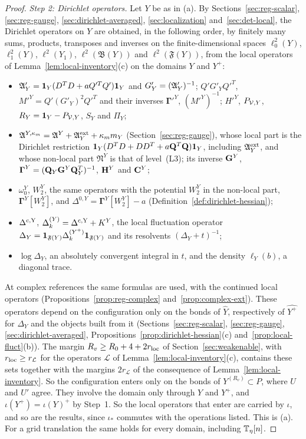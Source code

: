 \begin{proof}
\emph{Step 2: Dirichlet operators.} Let $Y$ be as in (a). By Sections~\ref{sec:reg-scalar}, \ref{sec:reg-gauge}, \ref{sec:dirichlet-averaged}, \ref{sec:localization} and~\ref{sec:det-local}, the Dirichlet operators on $Y$ are obtained, in the following order, by finitely many sums, products, transposes and inverses on the finite-dimensional spaces $\ell^2_0(Y)$, $\ell^2_1(Y)$, $\ell^2(Y_1)$, $\ell^2(\mathfrak B(Y))$ and $\ell^2(\mathfrak F(Y))$, from the local operators of Lemma~\ref{lem:local-inventory}(c) on the domains $Y$ and $Y^+$:
\begin{itemize}
\item $\mathfrak A'_Y=\mathbf 1_Y(D^TD+aQ'^TQ'^{\vphantom{T}})\mathbf 1_Y$ and $G'_Y=(\mathfrak A'_Y)^{-1}$; $Q'G'_YQ'^T$, $M'^Y=Q'(G'_Y)^2Q'^T$ and their inverses $\boldsymbol\Gamma'^Y$, $(M'^Y)^{-1}$; $H'^Y$, $P_{\mathcal V,Y}$, $R_Y=\mathbf 1_Y-P_{\mathcal V,Y}$, $S_Y$ and $\Pi_Y$;
\item $\mathfrak A^{Y,\kappa_m}=\mathfrak A^Y+\mathfrak A^{\rm ext}_Y+\kappa_mm_Y$ (Section~\ref{sec:reg-gauge}), whose local part is the Dirichlet restriction $\mathbf 1_Y(D^TD+DD^T+a\mathbf Q^T\mathbf Q)\mathbf 1_Y$, including $\mathfrak A^{\rm ext}_Y$, and whose non-local part $\mathfrak N^Y$ is that of level~(L3); its inverse $\mathbf G^Y$, $\boldsymbol\Gamma^Y=(\mathbf Q_Y\mathbf G^Y\mathbf Q_Y^T)^{-1}$, $\mathbf H^Y$ and $\mathbf C^Y$;
\item $\omega_0^Y$, $W_2^Y$, the same operators with the potential $W_2^Y$ in the non-local part, $\boldsymbol\Gamma^Y[W_2^Y]$, and $\Delta^{0,Y}=\boldsymbol\Gamma^Y[W_2^Y]-a$ (Definition~\ref{def:dirichlet-hessian});
\item $\Delta^{\rm c,Y}$, $\Delta^{(Y)}_k=\Delta^{\rm c,Y}+K^Y$, the local fluctuation operator $\Delta_Y=\mathbf 1_{\mathfrak F(Y)}\Delta^{(Y^+)}_k\mathbf 1_{\mathfrak F(Y)}$ and its resolvents $(\Delta_Y+t)^{-1}$;
\item $\log\Delta_Y$, an absolutely convergent integral in $t$, and the density $\ell_Y(b)$, a diagonal trace.
\end{itemize}
At complex references the same formulas are used, with the continued local operators (Propositions~\ref{prop:reg-complex} and~\ref{prop:complex-ext}). These operators depend on the configuration only on the bonds of $\hat Y$, respectively of $\widehat{Y^+}$ for $\Delta_Y$ and the objects built from it (Sections~\ref{sec:reg-scalar}, \ref{sec:reg-gauge}, \ref{sec:dirichlet-averaged}, Propositions~\ref{prop:dirichlet-hessian}(c) and~\ref{prop:local-fluct}(b)). The margin $R_v\ge R_0+4+2r_{\rm loc}$ of Section~\ref{sec:weakenable}, with $r_{\rm loc}\ge r_{\mathcal L}$ for the operators $\mathcal L$ of Lemma~\ref{lem:local-inventory}(c), contains these sets together with the margins $2r_{\mathcal L}$ of the consequence of Lemma~\ref{lem:local-inventory}. So the configuration enters only on the bonds of $Y^{(R_v)}\subset P$, where $U$ and $U'$ agree. They involve the domain only through $Y$ and $Y^+$, and $\iota(Y^+)=\iota(Y)^+$ by Step~1. So the local operators that enter are carried by $\iota$, and so are the results, since $\iota_*$ commutes with the operations listed. This is (a). For a grid translation the same holds for every domain, including $\mathbb T_\eta[n]$.


\end{proof}
